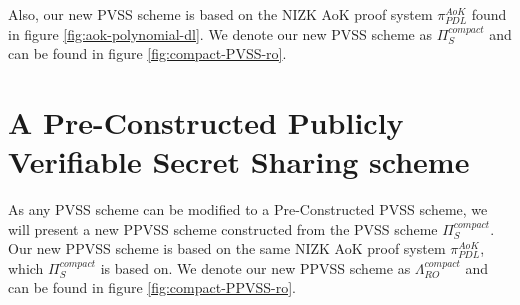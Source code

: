 Also, our new PVSS scheme is based on the NIZK AoK proof system $\pi_{PDL}^{AoK}$ found 
in figure \ref{fig:aok-polynomial-dl}. We denote our new PVSS scheme as $\Pi_{S}^{compact}$ and can 
be found in figure \ref{fig:compact-PVSS-ro}.



\section{A Pre-Constructed Publicly Verifiable Secret Sharing scheme}
\label{sec:PPVSS}
As any PVSS scheme can be modified to a Pre-Constructed PVSS scheme, we will present a new 
PPVSS scheme constructed from the PVSS scheme $\Pi_{S}^{compact}$. Our new PPVSS scheme is 
based on the same NIZK AoK proof system $\pi_{PDL}^{AoK}$, which $\Pi_{S}^{compact}$ is based on. 
We denote our new PPVSS scheme as $\Lambda_{RO}^{compact}$ and can be found in figure 
\ref{fig:compact-PPVSS-ro}.



